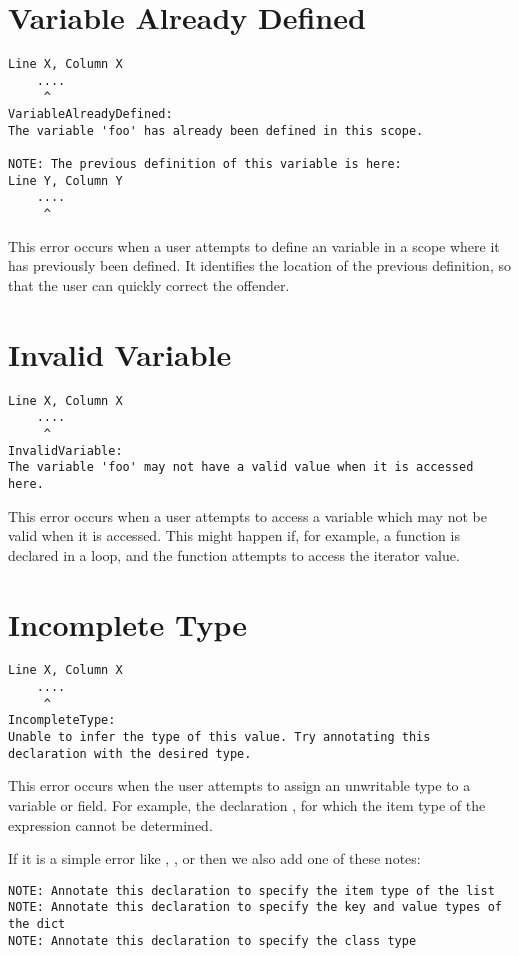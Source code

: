 \section{Variable Already Defined}
\begin{lstlisting}[breaklines]
Line X, Column X
    ....
     ^
VariableAlreadyDefined:
The variable 'foo' has already been defined in this scope.

NOTE: The previous definition of this variable is here:
Line Y, Column Y
    ....
     ^
\end{lstlisting}

This error occurs when a user attempts to define an variable in a scope where it
has previously been defined. It identifies the location of the previous
definition, so that the user can quickly correct the offender.

\section{Invalid Variable}
\begin{lstlisting}[breaklines]
Line X, Column X
    ....
     ^
InvalidVariable:
The variable 'foo' may not have a valid value when it is accessed here.
\end{lstlisting}

This error occurs when a user attempts to access a variable which may not be
valid when it is accessed. This might happen if, for example, a function is
declared in a loop, and the function attempts to access the iterator value.

\section{Incomplete Type}
\begin{lstlisting}[breaklines]
Line X, Column X
    ....
     ^
IncompleteType:
Unable to infer the type of this value. Try annotating this declaration with the desired type.
\end{lstlisting}

This error occurs when the user attempts to assign an unwritable type to a variable or field.
For example, the declaration , for which the item type of the expression cannot be determined.

If it is a simple error like , , or  then we also add one of these notes:
\begin{lstlisting}[breaklines]
NOTE: Annotate this declaration to specify the item type of the list
NOTE: Annotate this declaration to specify the key and value types of the dict
NOTE: Annotate this declaration to specify the class type
\end{lstlisting}

